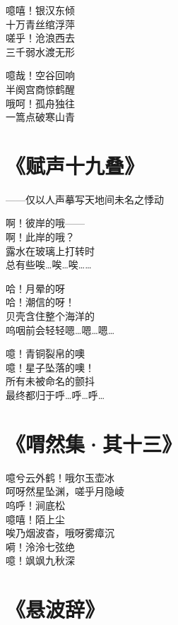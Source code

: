 噫嘻！银汉东倾 \\
十万青丝绾浮萍 \\
嗟乎！沧浪西去 \\
三千弱水渡无形
\vspace{1em}

噫哉！空谷回响 \\
半阕宫商惊鹤醒 \\
哦呵！孤舟独往 \\
一篙点破寒山青

\clearpage


\section{《赋声十九叠》}

——仅以人声摹写天地间未名之悸动
\vspace{1em}

啊！彼岸的哦—— \\
啊！此岸的哦？ \\
露水在玻璃上打转时 \\
总有些唉…唉…唉……
\vspace{1em}

哈！月晕的呀 \\
哈！潮信的呀！ \\
贝壳含住整个海洋的 \\
呜咽前会轻轻嗯…嗯…嗯…
\vspace{1em}

噫！青铜裂帛的噢 \\
噫！星子坠落的噢！ \\
所有未被命名的颤抖 \\
最终都归于呼…呼…呼…

\clearpage


\section{《喟然集·其十三》}

噫兮云外鹤！哦尔玉壶冰 \\
呵呀然星坠渊，嗟乎月隐崚 \\
呜呼！涧底松 \\
噫嘻！陌上尘 \\
唉乃烟波杳，哦呀雾瘴沉 \\
嗬！泠泠七弦绝 \\
噫！飒飒九秋深

\clearpage


\section{《悬波辞》}

